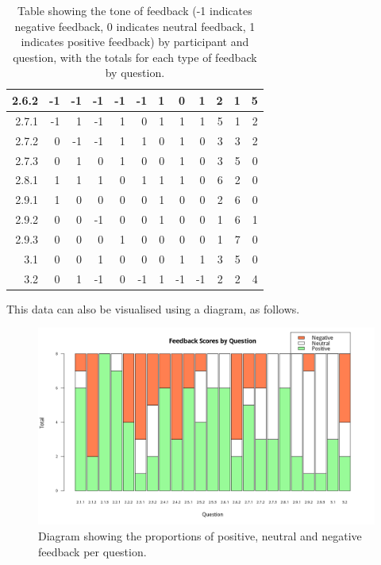 \documentclass[12pt,twoside,notitlepage,xetex]{report}
\begin{document}
{\begin{center}
\begin{table}[H]
\begin{center}
\begin{tabular}{|r||r|r|r|r||r|r|r|r||r|r|r|}
2.6.2 & -1 & -1 & -1 & -1 & -1 & 1 & 0 & 1 & 2 & 1 & 5\\ \hline
2.7.1 & -1 & 1 & -1 & 1 & 0 & 1 & 1 & 1 & 5 & 1 & 2\\ \hline
2.7.2 & 0 & -1 & -1 & 1 & 1 & 0 & 1 & 0 & 3 & 3 & 2\\ \hline
2.7.3 & 0 & 1 & 0 & 1 & 0 & 0 & 1 & 0 & 3 & 5 & 0\\ \hline
2.8.1 & 1 & 1 & 1 & 0 & 1 & 1 & 1 & 0 & 6 & 2 & 0\\ \hline
2.9.1 & 1 & 0 & 0 & 0 & 0 & 1 & 0 & 0 & 2 & 6 & 0\\ \hline
2.9.2 & 0 & 0 & -1 & 0 & 0 & 1 & 0 & 0 & 1 & 6 & 1\\ \hline
2.9.3 & 0 & 0 & 0 & 1 & 0 & 0 & 0 & 0 & 1 & 7 & 0\\ \hline
3.1 & 0 & 0 & 1 & 0 & 0 & 0 & 1 & 1 & 3 & 5 & 0\\ \hline
3.2 & 0 & 1 & -1 & 0 & -1 & 1 & -1 & -1 & 2 & 2 & 4\\
\hline
\end{tabular}
\end{center}
\caption{Table showing the tone of feedback (-1 indicates negative feedback, 0 indicates neutral feedback, 1 indicates positive feedback) by participant and question, with the totals for each type of feedback by question.}
\label{tab:FeedbackScores}
\end{table}
\end{center}

This data can also be visualised using a diagram, as follows.

\begin{center}
\begin{figure}[H]
\begin{center}
\includegraphics[width=\textwidth]{figs/graphs/stacked-scores.png}
\end{center}
\caption{Diagram showing the proportions of positive, neutral and negative feedback per question.}
\label{fig:StackedScores}
\end{figure}
\end{center}

}
\end{document}
